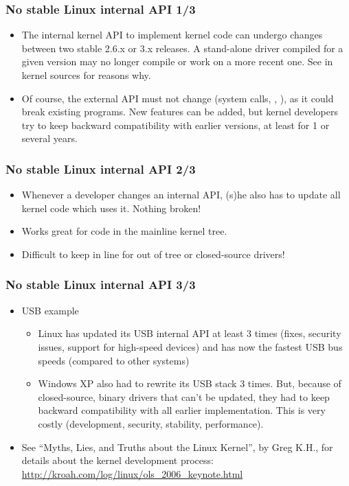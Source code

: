 \begin{frame}
  \frametitle{No stable Linux internal API 1/3}
  \begin{itemize}
  \item The internal kernel API to implement kernel code can undergo
    changes between two stable 2.6.x or 3.x releases. A stand-alone
    driver compiled for a given version may no longer compile or work
    on a more recent one. See
     in kernel sources for
    reasons why.
  \item Of course, the external API must not change (system calls,
    , ), as it could break existing
    programs. New features can be added, but kernel developers try to
    keep backward compatibility with earlier versions, at least for 1
    or several years.
  \end{itemize}
\end{frame}

\begin{frame}
  \frametitle{No stable Linux internal API 2/3}  
  \begin{itemize}
  \item Whenever a developer changes an internal API, (s)he also has
    to update all kernel code which uses it. Nothing broken!
  \item Works great for code in the mainline kernel tree.
  \item Difficult to keep in line for out of tree or closed-source
    drivers!
  \end{itemize}
\end{frame}

\begin{frame}
  \frametitle{No stable Linux internal API 3/3}
  \begin{itemize}
  \item USB example
    \begin{itemize}
    \item Linux has updated its USB internal API at least 3 times
      (fixes, security issues, support for high-speed devices) and has
      now the fastest USB bus speeds (compared to other systems)
    \item Windows XP also had to rewrite its USB stack 3 times. But,
      because of closed-source, binary drivers that can't be updated,
      they had to keep backward compatibility with all earlier
      implementation. This is very costly (development, security,
      stability, performance).
    \end{itemize}
  \item See “Myths, Lies, and Truths about the Linux Kernel”, by Greg
    K.H., for details about the kernel development process:
    \url{http://kroah.com/log/linux/ols_2006_keynote.html}
  \end{itemize}
\end{frame}

